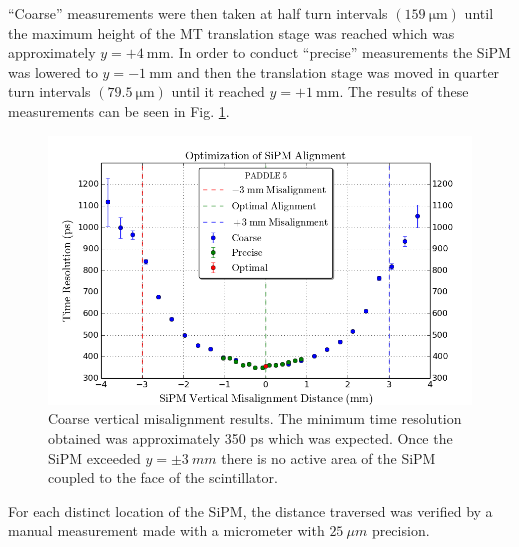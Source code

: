 ``Coarse'' measurements were then taken at half turn intervals $(159\ \mathrm{\mu m})$ until the maximum height of the MT translation stage was reached which was approximately $y = +4\ \mathrm{mm}$.  In order to conduct ``precise'' measurements the SiPM was lowered to $y = \mathrm{-1~mm}$ and then the translation stage was moved in quarter turn intervals $(79.5\ \mathrm{\mu m})$ until it reached $y = \mathrm{+1~mm}$.  The results of these measurements can be seen in Fig. \ref{fig:sipm_va_coarse}.
	\begin{figure}[!htb]
		\centering
		\includegraphics[width=1.0\columnwidth]{misalignment/figs/sipm_va_coarse}
		\caption{Coarse vertical misalignment results.  The minimum time resolution obtained was approximately 350 ps which was expected.  Once the SiPM exceeded $y = \pm 3\ mm$ there is no active area of the SiPM coupled to the face of the scintillator.}
		\label{fig:sipm_va_coarse}
	\end{figure}
For each distinct location of the SiPM, the distance traversed was verified by a manual measurement made with a micrometer with $25\ \mu m$ precision.

